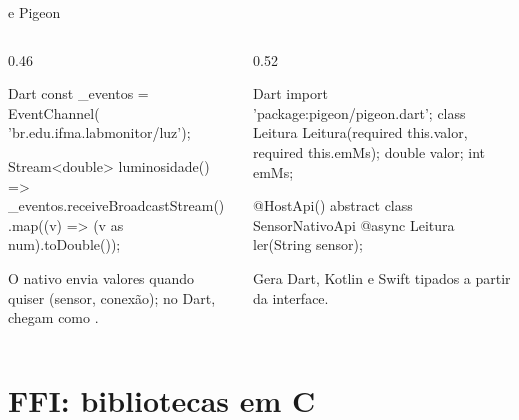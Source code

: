 \documentclass[aspectratio=169,10pt]{beamer}
\begin{document}
\begin{frame}[fragile]{ e Pigeon}
  \begin{columns}[T]
    \begin{column}{0.46\textwidth}
\begin{codigo}[title=Fluxo contínuo do nativo]{Dart}
const _eventos = EventChannel(
    'br.edu.ifma.labmonitor/luz');

Stream<double> luminosidade() =>
    _eventos.receiveBroadcastStream()
        .map((v) => (v as num).toDouble());
\end{codigo}
      \begin{conceito}
        O nativo envia valores quando quiser (sensor, conexão); no Dart, chegam como .
      \end{conceito}
    \end{column}
    \begin{column}{0.52\textwidth}
\begin{codigo}[title=pigeons/sensor\_api.dart]{Dart}
import 'package:pigeon/pigeon.dart';
class Leitura {
  Leitura({required this.valor, required this.emMs});
  double valor;
  int emMs;
}

@HostApi()
abstract class SensorNativoApi {
  @async
  Leitura ler(String sensor);
}
\end{codigo}
      \begin{dica}[Pigeon]
        Gera Dart, Kotlin e Swift tipados a partir da interface.
      \end{dica}
    \end{column}
  \end{columns}
\end{frame}

\section{FFI: bibliotecas em C}
\end{document}
